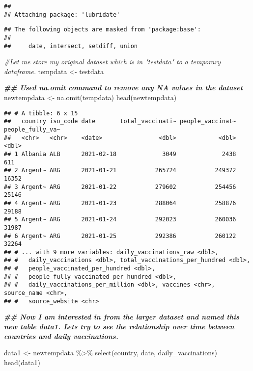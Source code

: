 \documentclass[
]{article}
\newenvironment{Shaded}{\begin{snugshade}}{\end{snugshade}}
\newcommand{\CommentTok}[1]{\textcolor[rgb]{0.56,0.35,0.01}{\textit{#1}}}
\newcommand{\DocumentationTok}[1]{\textcolor[rgb]{0.56,0.35,0.01}{\textbf{\textit{#1}}}}
\newcommand{\FunctionTok}[1]{\textcolor[rgb]{0.00,0.00,0.00}{#1}}
\newcommand{\NormalTok}[1]{#1}
\newcommand{\OtherTok}[1]{\textcolor[rgb]{0.56,0.35,0.01}{#1}}
\newcommand{\SpecialCharTok}[1]{\textcolor[rgb]{0.00,0.00,0.00}{#1}}
\begin{document}
\begin{verbatim}
## 
## Attaching package: 'lubridate'
\end{verbatim}

\begin{verbatim}
## The following objects are masked from 'package:base':
## 
##     date, intersect, setdiff, union
\end{verbatim}

\begin{Shaded}
\begin{Highlighting}[]
\CommentTok{\#Let me store my original dataset which is in "testdata" to a temporary dataframe.}
\NormalTok{tempdata }\OtherTok{\textless{}{-}}\NormalTok{ testdata}

\DocumentationTok{\#\# Used na.omit command to remove any NA values in the dataset }
\NormalTok{newtempdata }\OtherTok{\textless{}{-}} \FunctionTok{na.omit}\NormalTok{(tempdata)}
\FunctionTok{head}\NormalTok{(newtempdata)}
\end{Highlighting}
\end{Shaded}

\begin{verbatim}
## # A tibble: 6 x 15
##   country iso_code date       total_vaccinati~ people_vaccinat~ people_fully_va~
##   <chr>   <chr>    <date>                <dbl>            <dbl>            <dbl>
## 1 Albania ALB      2021-02-18             3049             2438              611
## 2 Argent~ ARG      2021-01-21           265724           249372            16352
## 3 Argent~ ARG      2021-01-22           279602           254456            25146
## 4 Argent~ ARG      2021-01-23           288064           258876            29188
## 5 Argent~ ARG      2021-01-24           292023           260036            31987
## 6 Argent~ ARG      2021-01-25           292386           260122            32264
## # ... with 9 more variables: daily_vaccinations_raw <dbl>,
## #   daily_vaccinations <dbl>, total_vaccinations_per_hundred <dbl>,
## #   people_vaccinated_per_hundred <dbl>,
## #   people_fully_vaccinated_per_hundred <dbl>,
## #   daily_vaccinations_per_million <dbl>, vaccines <chr>, source_name <chr>,
## #   source_website <chr>
\end{verbatim}

\begin{Shaded}
\begin{Highlighting}[]
\DocumentationTok{\#\# Now I am interested in from the larger dataset and named this new table \textquotesingle{}data1\textquotesingle{}. Lets try to see the relationship over time between countries and daily vaccinations.}

\NormalTok{data1 }\OtherTok{\textless{}{-}}\NormalTok{ newtempdata }\SpecialCharTok{\%\textgreater{}\%}
  \FunctionTok{select}\NormalTok{(country, date, daily\_vaccinations)}
\FunctionTok{head}\NormalTok{(data1)}
\end{Highlighting}
\end{Shaded}
\end{document}
